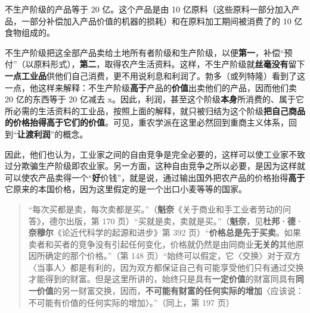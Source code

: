 不生产阶级的产品等于 20 亿。这个产品是由 10 亿原料（这些原料一部分加入产品，一部分补偿加入产品价值的机器的损耗）和在原料加工期间被消费了的 10 亿食物组成的。

不生产阶级把这全部产品卖给土地所有者阶级和生产阶级，以便\textbf{第一}，补偿“预付”（以原料形式），\textbf{第二}，取得农产生活资料。这样，不生产阶级就\textbf{丝毫没有}留下\textbf{一点工业品}供他们自己消费，更不用说利息和利润了。勃多（或列特隆）看到了这一点，他这样来解释：不生产阶级\textbf{高于}产品的\textbf{价值}出卖他们的产品，因而他们卖 20 亿的东西等于 20 亿减去 x。因此，利润，甚至这个阶级\textbf{本身}所消费的、属于它所必需的生活资料的工业品，按照上面的解释，就只被归结为这个阶级\textbf{把自己商品的价格抬得高于它们的价值}。可见，重农学派在这里必然回到重商主义体系，回到“\textbf{让渡利润}”的概念。

因此，他们也认为，工业家之间的自由竞争是完全必要的，这样可以使工业家不致过分欺骗生产阶级即农业家。另一方面，这种自由竞争之所以必要，是因为这样就可以使农产品卖得一个“\textbf{好}价钱”，就是说，通过输出国外把农产品的价格抬得\textbf{高于}它原来的本国价格，因为这里假定的是一个出口小麦等等的国家。


\begin{quote}“每次买都是卖，每次卖都是买。”（\textbf{魁奈}《关于商业和手工业者劳动的问答》，德尔出版，第 170 页）“买就是卖，卖就是买。”（\textbf{魁奈}，见\textbf{杜邦·德·奈穆尔}《论近代科学的起源和进步》第 392 页）“\textbf{价格总是先于买卖}。如果卖者和买者的竞争没有引起任何变化，价格就仍然是由同商业\textbf{无关的}其他原因所确定的那个价格。”（第 148 页）“始终可以假定，它〈交换〉对于双方〈当事人〉都是有利的，因为双方都保证自己有可能享受他们只有通过交换才能得到的财富。但是这里所讲的，始终只是具有\textbf{一定价值}的财富同具有\textbf{同一价值}的另一财富交换，因而，\textbf{不可能有财富的任何实际的增加}〈应该说：不可能有价值的任何实际的增加〉。”（同上，第 197 页）\end{quote}

